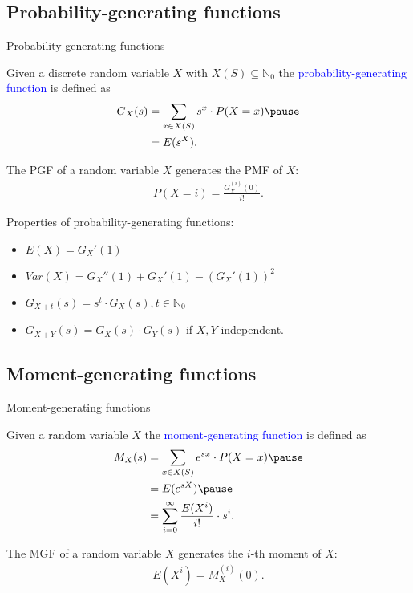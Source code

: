 \documentclass{beamer}
\def\padding{\vspace{0.5cm}}
\def\b{\textcolor{blue}}
\begin{document}
\subsection{Probability-generating functions}
\begin{frame}{Probability-generating functions}
    \begin{definition}
       Given a discrete random variable $X$ with $X(S) \subseteq \mathbb{N}_0$ the \b{probability-generating function} is defined as
        \begin{align*}
            G_X(s) &= \sum_{x \in X(S)} s^x \cdot P(X=x)\pause \\
                   &= E(s^X).
        \end{align*}
    \end{definition}\pause\par\padding
    The PGF of a random variable $X$ generates the PMF of $X$:
    \begin{align*}
        P(X = i) = \frac{G_X^{(i)}(0)}{i!}.
    \end{align*}
\end{frame}

\begin{frame}
    Properties of probability-generating functions:\pause
    \begin{itemize}
        \item $E(X) = G_X'(1)$\pause
        \item $Var(X) = G_X''(1) + G_X'(1) - (G_X'(1))^2$\pause
        \item $G_{X + t}(s) = s^t \cdot G_X(s), t \in \mathbb{N}_0$\pause
        \item $G_{X + Y}(s) = G_X(s) \cdot G_Y(s)$ if $X,Y$ independent.
    \end{itemize}
\end{frame}

\subsection{Moment-generating functions}
\begin{frame}{Moment-generating functions}
    \begin{definition}
       Given a random variable $X$ the \b{moment-generating function} is defined as
        \begin{align*}
            M_X(s) &= \sum_{x \in X(S)} e^{s x} \cdot P(X=x)\pause \\
                   &= E(e^{s X})\pause \\
                   &= \sum_{i=0}^{\infty} \frac{E(X^i)}{i!} \cdot s^i.
        \end{align*}
    \end{definition}\pause\par\padding
    The MGF of a random variable $X$ generates the $i$-th moment of $X$:
    \begin{align*}
        E(X^i) = M_X^{(i)}(0).
    \end{align*}
\end{frame}
\end{document}
